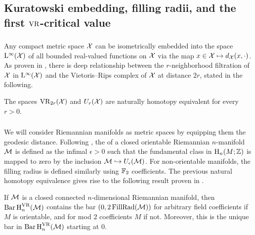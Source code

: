 

\subsection{Kuratowski embedding, filling radii, and the first \(\mathrm{VR}\)-critical value}\label{sub:filling radii}

\subsubsection{}\label{ss:kuratowski}

Any compact metric space $\mathcal{X}$ can be isometrically embedded into the space $\mathrm{L}^\infty(\mathcal{X})$ of all bounded real-valued functions on $\mathcal{X}$ via the map $x \in \mathcal{X} \mapsto d_{\mathcal{X}}(x,\cdot)$.
As proven in \cite[Theorem.4.1]{lim2020vietoris}, there is deep relationship between the \(r\)-neighborhood filtration of $\mathcal{X}$ in $\mathrm{L}^\infty(\mathcal{X})$ and the Vietoris--Rips complex of \(\mathcal{X}\) at distance \(2r\), stated in the following.

\medskip\lemma The spaces $\mathrm{VR}_{2r}(\mathcal{X})$ and $U_r(\mathcal{X})$ are naturally homotopy equivalent for every \(r > 0\).

\subsubsection{}\label{ss:filling_radius}

We will consider Riemannian manifolds as metric spaces by equipping them the geodesic distance.
Following \cite{gromov1983filling}, the  of a closed orientable Riemannian $n$-manifold $\mathcal{M}$ is defined as the infimal $\epsilon > 0$ such that the fundamental class in $\mathrm{H}_n(M; \mathbb{Z})$ is mapped to zero by the inclusion $\mathcal{M} \hookrightarrow U_\epsilon(\mathcal{M})$.
For non-orientable manifolds, the filling radius is defined similarly using \({\mathbb{F}_2}\) coefficients.
The previous natural homotopy equivalence gives rise to the following result proven in \cite[Prop.9.28]{lim2020vietoris}.

\medskip\lemma
If $\mathcal{M}$ is a closed connected $n$-dimensional Riemannian manifold, then \(\operatorname{Bar} \operatorname{H}_{n}^{\mathrm{VR}} (\mathcal{M})\) contains the bar \((0,2\operatorname{FillRad}(\mathcal{M}))\) for arbitrary field coefficients if $M$ is orientable, and for mod $2$ coefficients $M$ if not.
Moreover, this is the unique bar in \(\operatorname{Bar} \operatorname{H}_{n}^{\mathrm{VR}} (\mathcal{M})\) starting at $0$.

